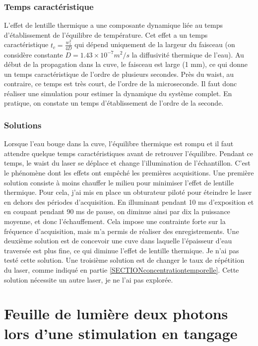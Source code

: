 \subsubsection{Temps caractéristique}

L'effet de lentille thermique a une composante dynamique liée au temps d'établissement de l'équilibre de température. Cet effet a un temps caractéristique $t_c = \frac{w_z^2}{4D}$ qui dépend uniquement de la largeur du faisceau (on considère constante $D = 1.43\times 10^{-7} m^2/s$ la diffusivité thermique de l'eau). Au début de la propagation dans la cuve, le faisceau est large (1 mm), ce qui donne un temps caractéristique de l'ordre de plusieurs secondes. Près du waist, au contraire, ce temps est très court, de l'ordre de la microseconde. Il faut donc réaliser une simulation pour estimer la dynamique du système complet. 
En pratique, on constate un temps d'établissement de l'ordre de la seconde.

\subsubsection{Solutions}\label{solutionseffetthermique}

Lorsque l'eau bouge dans la cuve, l'équilibre thermique est rompu et il faut attendre quelque temps caractéristiques avant de retrouver l'équilibre. Pendant ce temps, le waist du laser se déplace et change l'illumination de l'échantillon. C'est le phénomène dont les effets ont empêché les premières acquisitions. Une première solution consiste à moins chauffer le milieu pour minimiser l'effet de lentille thermique. Pour cela, j'ai mis en place un obturateur piloté pour éteindre le laser en dehors des périodes d'acquisition. En illuminant pendant 10 ms d'exposition et en coupant pendant 90 ms de pause, on diminue ainsi par dix la puissance moyenne, et donc l'échauffement. Cela impose une contrainte forte sur la fréquence d'acquisition, mais m'a permis de réaliser des enregistrements.
Une deuxième solution est de concevoir une cuve dans laquelle l'épaisseur d'eau traversée est plus fine, ce qui diminue l'effet de lentille thermique. Je n'ai pas testé cette solution.
Une troisième solution est de changer le taux de répétition du laser, comme indiqué en partie \ref{SECTIONconcentrationtemporelle}. Cette solution nécessite un autre laser, je ne l'ai pas explorée.



\section{Feuille de lumière deux photons lors d'une stimulation en tangage}

